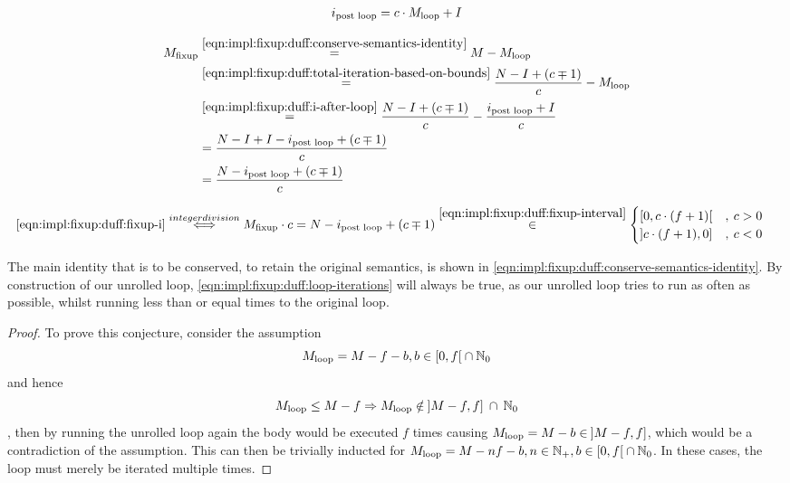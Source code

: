 \begin{equation}\label{eqn:impl:fixup:duff:i-after-loop}
    \begin{aligned}
        i_\text{post loop} = c \cdot M_{\text{loop}} + I
    \end{aligned}
\end{equation}

\begin{equation}\label{eqn:impl:fixup:duff:fixup-i}
    \begin{aligned}
        M_{\text{fixup}} & \overset{\ref{eqn:impl:fixup:duff:conserve-semantics-identity}}{=} M - M_{\text{loop}} \\
        & \overset{\ref{eqn:impl:fixup:duff:total-iteration-based-on-bounds}}{=}
            \frac{N - I + (c \mp 1)}{c} - M_{\text{loop}} \\
        & \overset{\ref{eqn:impl:fixup:duff:i-after-loop}}{=}
        \frac{N - I + (c \mp 1)}{c} - \frac{i_\text{post loop} + I}{c} \\
        &= \frac{N - I + I - i_\text{post loop} + (c \mp 1)}{c}\\
        &= \frac{N - i_\text{post loop} + (c \mp 1)}{c}
    \end{aligned}
\end{equation}

\begin{equation}\label{eqn:impl:fixup:duff:fixup-i-mult}
    \begin{aligned}
        \ref{eqn:impl:fixup:duff:fixup-i} &\overset{integer division}{\Longleftrightarrow} M_{\text{fixup}} \cdot c = N - i_\text{post loop} + (c \mp 1) \overset{\ref{eqn:impl:fixup:duff:fixup-interval}}{\in}  \begin{cases} \lbrack 0, c \cdot (f + 1) \lbrack &, \medspace c > 0\\ \rbrack c \cdot (f + 1), 0 \rbrack &, \medspace c < 0 \end{cases} 
    \end{aligned}
\end{equation}

The main identity that is to be conserved, to retain the original semantics, is shown in \cref{eqn:impl:fixup:duff:conserve-semantics-identity}.
By construction of our unrolled loop, \cref{eqn:impl:fixup:duff:loop-iterations} will always be true, as our unrolled loop tries to run as often as possible, whilst running less than or equal times to the original loop.

\begin{proof}\label{proof:impl:fixup:duff:loop-iterations}
    To prove this conjecture, consider the assumption
    \[M_{\text{loop}} = M - f - b,  b \in \lbrack 0, f \lbrack \medspace \cap \medspace \mathbb{N}_0\]
    and hence
    \[M_{\text{loop}} \leq M - f \Rightarrow M_{\text{loop}} \notin \medspace \rbrack M-f,f \rbrack \medspace \cap \medspace \mathbb{N}_0 \]
    , then by running the unrolled loop again the body would be executed $f$ times causing $M_{\text{loop}} = M - b \in \medspace \rbrack M-f,f \rbrack$, which would be a contradiction of the assumption.
    This can then be trivially inducted for $M_{\text{loop}} = M - nf - b, n \in \mathbb{N}_{+}, b \in \lbrack 0, f \lbrack \medspace \cap \medspace \mathbb{N}_0$.
    In these cases, the loop must merely be iterated multiple times.
\end{proof}


